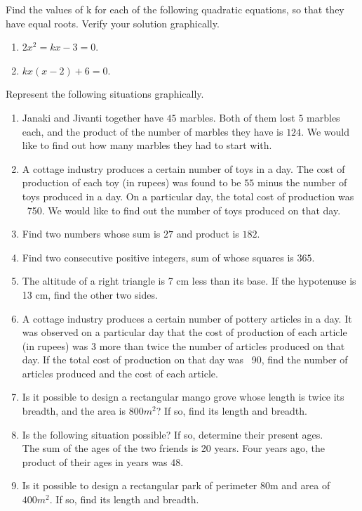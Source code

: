 Find the values of k for each of the following quadratic equations, so that they have equal roots.  Verify your solution graphically.
\begin{enumerate}[label=\thesubsection.\arabic*,ref=\thesubsection.\theenumi,resume*]
\item $2x^2=kx-3=0$.
\item $kx(x-2)+6=0$.
\end{enumerate}
Represent the following situations graphically.
\begin{enumerate}[label=\thesubsection.\arabic*,ref=\thesubsection.\theenumi,resume*]
\item Janaki and Jivanti together have $45$ marbles. Both of them lost $5$ marbles each, and the product of the number of marbles they have is $124$. We would like to find out how many marbles they had to start with.
\item A cottage industry produces a certain number of toys in a day. The cost of production of each toy (in rupees) was found to be $55$ minus the number of toys produced in a day. On a particular day, the total cost of production was \rupee~750. We would like to find out the number of toys produced on that day.
\item Find two numbers whose sum is $27$ and product is $182$.
\item Find two consecutive  positive integers, sum of whose squares is $365$.
\item  The altitude of a right triangle is 7 cm less than its base. If the hypotenuse is 13 cm, find the other two sides.
\item A cottage industry produces a certain number of pottery articles in a day. It was observed on a particular day that the cost of production of each article (in rupees) was $3$ more than twice the number of articles produced on that day. If the total cost of production on that day was \rupee~90, find the number of articles produced and the cost of each article.
\item Is it possible to design a rectangular mango grove whose length is twice its breadth, and the area is  $800m^2$? If so, find its length and breadth.
\item Is the following situation possible? If so, determine their present ages.
\\ The sum of the ages of the two friends is 20 years. Four years ago, the product of their ages in years was $48$.
\item Is it possible to design a rectangular park of perimeter 80m and area of $400m^2$. If so, find its length and breadth.

\end{enumerate}
